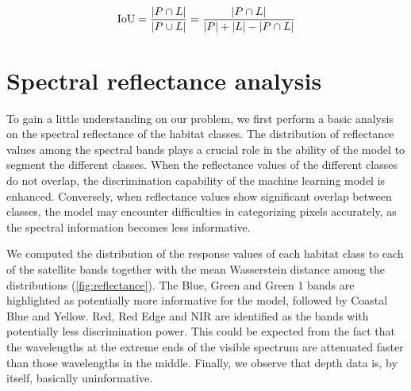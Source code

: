 \begin{equation*}
    \text{IoU} = \frac{\abs{P\cap L}}{\abs{P\cup L}}=\frac{\abs{P\cap
            L}}{\abs{P} + \abs{L} - \abs{P\cap L}}
\end{equation*}

\section{Spectral reflectance analysis}\label{app:spectral_reflectance}

To gain a little understanding on our problem, we first perform a basic
analysis on the spectral reflectance of the habitat classes. The distribution
of reflectance values among the spectral bands plays a crucial
role in the ability of the model to segment the different classes. When the
reflectance values of the different classes do not overlap, the discrimination
capability of the machine learning model is enhanced. Conversely, when
reflectance values show significant overlap between classes, the model may
encounter difficulties in categorizing pixels accurately, as the spectral
information becomes less informative.

We computed the distribution of the response values of each habitat class
to each of the satellite bands together with the mean Wasserstein distance
among the distributions (\cref{fig:reflectance}). The Blue, Green and Green 1
bands are highlighted as potentially more informative for the model, followed
by Coastal Blue and Yellow. Red, Red Edge and NIR are identified as the bands
with potentially less discrimination power. This could be expected from the
fact that the wavelengths at the extreme ends of the visible spectrum are
attenuated faster than those wavelengths in the middle. Finally, we observe
that depth data is, by itself, basically uninformative.

